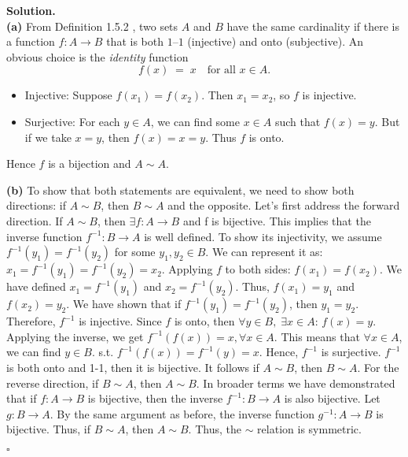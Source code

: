 \documentclass[12pt]{article}
\theoremstyle{definition}
\theoremstyle{remark}
\newenvironment{solution}{
    \noindent
    \textbf{Solution.}\\
}{
    \quad \hfill $\square$
    \vspace{1em}
}
\begin{document}
\begin{solution}
\noindent
\textbf{(a)} 
From Definition 1.5.2 \cite{abbott2015understanding}, two sets $A$ and $B$ have the same cardinality if there is a function $f: A \to B$ that is both $1$--$1$ (injective) and onto (subjective). An obvious choice is the \emph{identity} function
\[
f(x) \;=\; x \quad \text{for all } x \in A.
\]
\begin{itemize}
    \item Injective: 
    Suppose $f(x_1) = f(x_2)$. Then $x_1 = x_2$, so $f$ is injective.
    \item Surjective:
    For each $y \in A$, we can find some $x \in A$ such that $f(x) = y$.  But if we take $x = y$, then $f(x) = x = y$. Thus $f$ is onto.
\end{itemize}
Hence $f$ is a bijection and $A\sim A$. 

\medskip

\noindent
\textbf{(b)} 
To show that both statements are equivalent, we need to show both directions: if $A \sim B$, then $B \sim A$ and the opposite. Let's first address the forward direction. If $A \sim B$, then $\exists f: A\rightarrow{B}$ and f is bijective. This implies that the inverse function $f^{-1}:B\rightarrow{A}$ is well defined. To show its injectivity, we assume $f^{-1}(y_1)=f^{-1}(y_2)$ for some $y_1, y_2 \in B$. We can represent it as: $x_1 = f^{-1}(y_1)=f^{-1}(y_2) = x_2$. Applying $f$ to both sides: $f(x_1) = f(x_2)$. We have defined $x_1=f^{-1}(y_1)$ and $x_2=f^{-1}(y_2)$. Thus, $f(x_1)=y_1$ and $f(x_2)=y_2$. We have shown that if $f^{-1}(y_1)=f^{-1}(y_2)$, then $y_1=y_2$. Therefore, $f^{-1}$ is injective. Since $f$ is onto, then $\forall y \in B,\; \exists x\in A$: $f(x)=y$. Applying the inverse, we get $f^{-1}(f(x))=x, \forall x \in A.$ This means that $\forall x \in A$, we can find $y \in B$. s.t. $f^{-1}(f(x))=f^{-1}(y)=x$. Hence, $f^{-1}$ is surjective. $f^{-1}$ is both onto and 1-1, then it is bijective. It follows if $A \sim B$, then $B \sim A$. For the reverse direction, if $B \sim A$, then $A \sim B$. In broader terms we have demonstrated that if $f: A \rightarrow{B}$ is bijective, then the inverse $f^{-1}: B \rightarrow{A}$ is also bijective. Let $g:B\rightarrow{A}$. By the same argument as before, the inverse function $g^{-1}:A \rightarrow{B}$ is bijective. Thus, if $B \sim A$, then $A \sim B$. Thus, the $\sim$ relation is symmetric.

\medskip


\end{solution}
\end{document}
